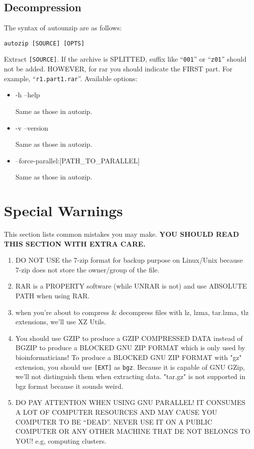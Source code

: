 \documentclass[journal,twocolumn]{IEEEtran}
\begin{document}
\subsection{Decompression}
The syntax of autounzip are as follows:
\begin{verbatim}
autozip [SOURCE] [OPTS]
\end{verbatim}
Extract \verb|[SOURCE]|. If the archive is SPLITTED, suffix like ``\verb|001|'' or ``\verb|z01|'' should not be added. HOWEVER, for rar you should indicate the FIRST part. For example, ``\verb|r1.part1.rar|''. Available options:
\begin{itemize}
	\item -h \textbar --help \par Same as those in autozip.
	\item -v \textbar --version \par Same as those in autozip.
	\item --force-parallel:[PATH\_TO\_PARALLEL] \par Same as those in autozip.
\end{itemize}
\section{Special Warnings}
This section lists common mistakes you may make. \textbf{YOU SHOULD READ THIS SECTION WITH EXTRA CARE.} \par
\begin{enumerate}
\item DO NOT USE the 7-zip format for backup purpose on Linux/Unix because 7-zip does not store the owner/group of the file.
\item RAR is a PROPERTY software (while UNRAR is not) and use ABSOLUTE PATH when using RAR.
\item when you're about to compress \& decompress files with lz, lzma, tar.lzma, tlz extensions, we'll use XZ Utils.
\item You should use GZIP to produce a GZIP COMPRESSED DATA instead of BGZIP to produce a BLOCKED GNU ZIP FORMAT which is only used by bioinformaticians! To produce a BLOCKED GNU ZIP FORMAT with "gz" extension, you should use \verb|[EXT]| as \verb|bgz|. Because it is capable of GNU GZip, we'll not distinguish them when extracting data. "tar.gz" is not supported in bgz format because it sounds weird.
\item DO PAY ATTENTION WHEN USING GNU PARALLEL! IT CONSUMES A LOT OF COMPUTER RESOURCES AND MAY CAUSE YOU COMPUTER TO BE ``DEAD''. NEVER USE IT ON A PUBLIC COMPUTER OR ANY OTHER MACHINE THAT DE NOT BELONGS TO YOU! e.g, computing clusters.
\end{enumerate}
\end{document}
